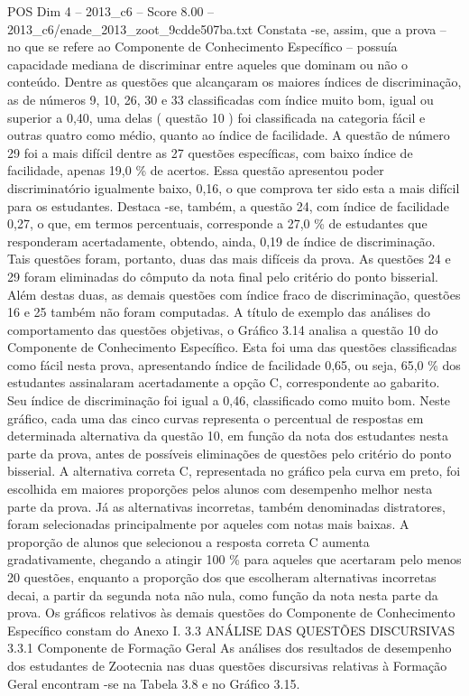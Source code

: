 \begin{textsample}{POS Dim 4 – 2013\_c6 – Score 8.00 – 2013\_c6/enade\_2013\_zoot\_9cdde507ba.txt}
Constata -se, assim, que a prova – no que se refere ao Componente de Conhecimento Específico – possuía capacidade mediana de discriminar entre aqueles que dominam ou não o conteúdo.
Dentre as questões que alcançaram os maiores índices de discriminação, as de números 9, 10, 26, 30 e 33 classificadas com índice muito bom, igual ou superior a 0,40, uma delas ( questão 10 ) foi classificada na categoria fácil e outras quatro como médio, quanto ao índice de facilidade.
A questão de número 29 foi a mais difícil dentre as 27 questões específicas, com baixo índice de facilidade, apenas 19,0 \% de acertos.
Essa questão apresentou poder discriminatório igualmente baixo, 0,16, o que comprova ter sido esta a mais difícil para os estudantes.
Destaca -se, também, a questão 24, com índice de facilidade 0,27, o que, em termos percentuais, corresponde a 27,0 \% de estudantes que responderam acertadamente, obtendo, ainda, 0,19 de índice de discriminação.
Tais questões foram, portanto, duas das mais difíceis da prova.
As questões 24 e 29 foram eliminadas do cômputo da nota final pelo critério do ponto bisserial.
Além destas duas, as demais questões com índice fraco de discriminação, questões 16 e 25 também não foram computadas.
A título de exemplo das análises do comportamento das questões objetivas, o Gráfico 3.14 analisa a questão 10 do Componente de Conhecimento Específico.
Esta foi uma das questões classificadas como fácil nesta prova, apresentando índice de facilidade 0,65, ou seja, 65,0 \% dos estudantes assinalaram acertadamente a opção C, correspondente ao gabarito.
Seu índice de discriminação foi igual a 0,46, classificado como muito bom.
Neste gráfico, cada uma das cinco curvas representa o percentual de respostas em determinada alternativa da questão 10, em função da nota dos estudantes nesta parte da prova, antes de possíveis eliminações de questões pelo critério do ponto bisserial.
A alternativa correta C, representada no gráfico pela curva em preto, foi escolhida em maiores proporções pelos alunos com desempenho melhor nesta parte da prova.
Já as alternativas incorretas, também denominadas distratores, foram selecionadas principalmente por aqueles com notas mais baixas.
A proporção de alunos que selecionou a resposta correta C aumenta gradativamente, chegando a atingir 100 \% para aqueles que acertaram pelo menos 20 questões, enquanto a proporção dos que escolheram alternativas incorretas decai, a partir da segunda nota não nula, como função da nota nesta parte da prova.
Os gráficos relativos às demais questões do Componente de Conhecimento Específico constam do Anexo I. 3.3 ANÁLISE DAS QUESTÕES DISCURSIVAS 3.3.1 Componente de Formação Geral As análises dos resultados de desempenho dos estudantes de Zootecnia nas duas questões discursivas relativas à Formação Geral encontram -se na Tabela 3.8 e no Gráfico 3.15.

\end{textsample}
